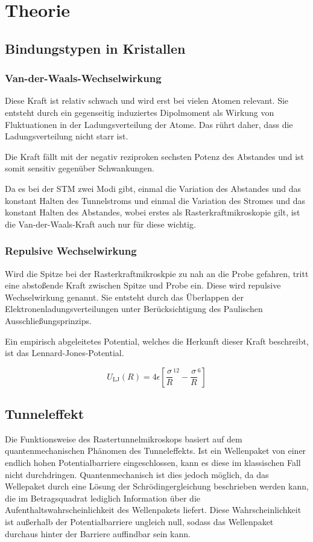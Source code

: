 \section{Theorie}
\subsection{Bindungstypen in Kristallen}
\subsubsection{Van-der-Waals-Wechselwirkung}
Diese Kraft ist relativ schwach und wird erst bei vielen Atomen relevant. Sie entsteht durch ein gegenseitig induziertes Dipolmoment als Wirkung von Fluktuationen in der Ladungsverteilung der Atome. Das rührt daher, dass die Ladungsverteilung nicht starr ist.

\noindent Die Kraft fällt mit der negativ reziproken sechsten Potenz des Abstandes und ist somit sensitiv gegenüber Schwankungen.

\noindent Da es bei der STM zwei Modi gibt, einmal die Variation des Abstandes und das konstant Halten des Tunnelstroms und einmal die Variation des Stromes und das konstant Halten des Abstandes, wobei erstes als Rasterkraftmikroskopie gilt, ist die Van-der-Waals-Kraft auch nur für diese wichtig.

\subsubsection{Repulsive Wechselwirkung}
Wird die Spitze bei der Rasterkraftmikroskpie zu nah an die Probe gefahren, tritt eine abstoßende Kraft zwischen Spitze und Probe ein. Diese wird repulsive Wechselwirkung genannt. Sie entsteht durch das Überlappen der Elektronenladungsverteilungen unter Berücksichtigung des Paulischen Ausschließungsprinzips.

\noindent Ein empirisch abgeleitetes Potential, welches die Herkunft dieser Kraft beschreibt, ist das Lennard-Jones-Potential.

\begin{equation}
U_\text{LJ}(R)=4\epsilon\left[\frac{\sigma}{R}^{12}-\frac{\sigma}{R}^6\right]
\end{equation}

\subsection{Tunneleffekt}
Die Funktionsweise des Rastertunnelmikroskops basiert auf dem quantenmechanischen Phänomen des Tunneleffekts. Ist ein Wellenpaket von einer endlich hohen Potentialbarriere eingeschlossen, kann es diese im klassischen Fall nicht durchdringen. Quantenmechanisch ist dies jedoch möglich, da das Wellepaket durch eine Lösung der Schrödingergleichung beschrieben werden kann, die im Betragsquadrat lediglich Information über die Aufenthaltswahrscheinlichkeit des Wellenpakets liefert. Diese Wahrscheinlichkeit ist außerhalb der Potentialbarriere ungleich null, sodass das Wellenpaket durchaus hinter der Barriere auffindbar sein kann. 

